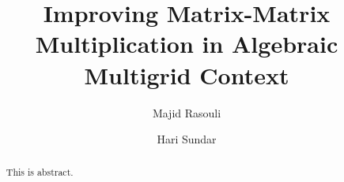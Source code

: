 \documentclass[sigconf]{acmart}
\begin{document}
\title{Improving Matrix-Matrix Multiplication in Algebraic Multigrid Context}

\author{Majid Rasouli}

\author{Hari Sundar}




\begin{abstract}
This is abstract.
\end{abstract}

%
%
\iffalse
\begin{CCSXML}
<ccs2012>
 <concept>
  <concept_id>10010520.10010553.10010562</concept_id>
  <concept_desc>Computer systems organization~Embedded systems</concept_desc>
  <concept_significance>500</concept_significance>
 </concept>
 <concept>
  <concept_id>10010520.10010575.10010755</concept_id>
  <concept_desc>Computer systems organization~Redundancy</concept_desc>
  <concept_significance>300</concept_significance>
 </concept>
 <concept>
  <concept_id>10010520.10010553.10010554</concept_id>
  <concept_desc>Computer systems organization~Robotics</concept_desc>
  <concept_significance>100</concept_significance>
 </concept>
 <concept>
  <concept_id>10003033.10003083.10003095</concept_id>
  <concept_desc>Networks~Network reliability</concept_desc>
  <concept_significance>100</concept_significance>
 </concept>
</ccs2012>
\end{CCSXML}

\ccsdesc[500]{Computer systems organization~Embedded systems}
\ccsdesc[300]{Computer systems organization~Redundancy}
\ccsdesc{Computer systems organization~Robotics}
\ccsdesc[100]{Networks~Network reliability}
\fi


\maketitle





%
%
\end{document}
